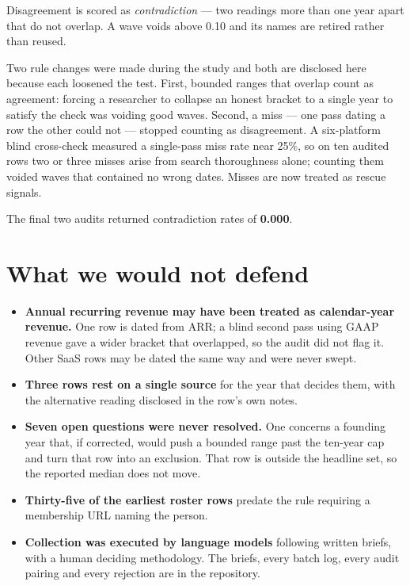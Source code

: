 \documentclass[11pt]{article}
\begin{document}
Disagreement is scored as \emph{contradiction} --- two readings more than one
year apart that do not overlap. A wave voids above 0.10 and its names are retired
rather than reused.

Two rule changes were made during the study and both are disclosed here because
each loosened the test. First, bounded ranges that overlap count as agreement:
forcing a researcher to collapse an honest bracket to a single year to satisfy
the check was voiding good waves. Second, a miss --- one pass dating a row the
other could not --- stopped counting as disagreement. A six-platform blind
cross-check measured a single-pass miss rate near 25\%, so on ten audited rows
two or three misses arise from search thoroughness alone; counting them voided
waves that contained no wrong dates. Misses are now treated as rescue signals.

The final two audits returned contradiction rates of \textbf{0.000}.

\section{What we would not defend}

\begin{itemize}
\item \textbf{Annual recurring revenue may have been treated as calendar-year
revenue.} One row is dated from ARR; a blind second pass using GAAP revenue gave
a wider bracket that overlapped, so the audit did not flag it. Other SaaS rows
may be dated the same way and were never swept.
\item \textbf{Three rows rest on a single source} for the year that decides
them, with the alternative reading disclosed in the row's own notes.
\item \textbf{Seven open questions were never resolved.} One concerns a founding
year that, if corrected, would push a bounded range past the ten-year cap and
turn that row into an exclusion. That row is outside the headline set, so the
reported median does not move.
\item \textbf{Thirty-five of the earliest roster rows} predate the rule
requiring a membership URL naming the person.
\item \textbf{Collection was executed by language models} following written
briefs, with a human deciding methodology. The briefs, every batch log, every
audit pairing and every rejection are in the repository.
\end{itemize}
\end{document}
